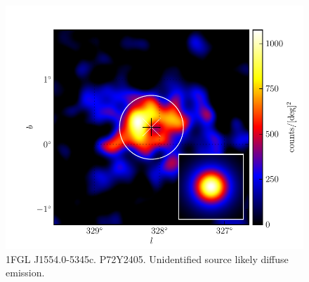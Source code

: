 \documentclass[preprint]{aastex}
\begin{document}
  \begin{figure}
    \begin{center}
      \includegraphics[type=pdf,ext=.pdf,read=.pdf]{source_plots/source_1FGL_J1554.0-5345c}
    \end{center}
    \caption{1FGL J1554.0-5345c. P72Y2405. Unidentified source likely diffuse emission.}
  \end{figure}
\end{document}
